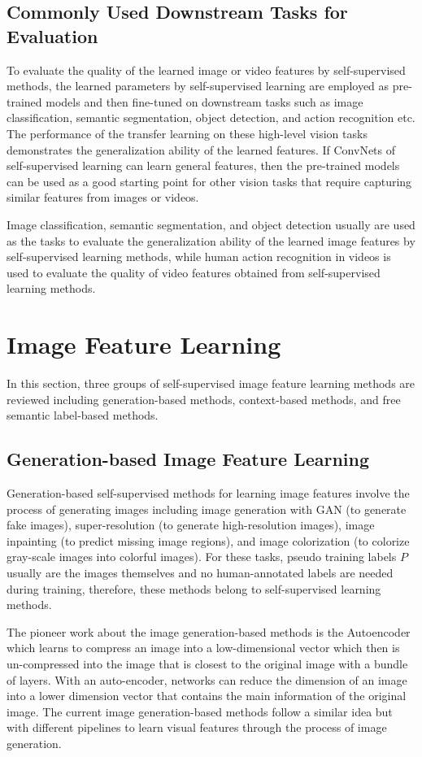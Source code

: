\documentclass[conference]{IEEEtran}
\begin{document}
\subsection{Commonly Used Downstream Tasks for Evaluation}
To evaluate the quality of the learned image or video features by self-supervised methods, the learned parameters by self-supervised learning are employed as pre-trained models and then fine-tuned on downstream tasks such as image classification, semantic segmentation, object detection, and action recognition etc.
The performance of the transfer learning on these high-level vision tasks demonstrates the generalization ability of the learned features.
If ConvNets of self-supervised learning can learn general features, then the pre-trained models can be used as a good starting point for other vision tasks that require capturing similar features from images or videos.

Image classification, semantic segmentation, and object detection usually are used as the tasks to evaluate the generalization ability of the learned image features by self-supervised learning methods, while human action recognition in videos is used to evaluate the quality of video features obtained from self-supervised learning methods.

\section{Image Feature Learning}
In this section, three groups of self-supervised image feature learning methods are reviewed including generation-based methods, context-based methods, and free semantic label-based methods.

\subsection{Generation-based Image Feature Learning}
Generation-based self-supervised methods for learning image features involve the process of generating images including image generation with GAN (to generate fake images), super-resolution (to generate high-resolution images), image inpainting (to predict missing image regions),
and image colorization (to colorize gray-scale images into colorful images).
For these tasks, pseudo training labels $P$ usually are the images themselves and no human-annotated labels are needed during training, therefore, these methods belong to self-supervised learning methods.

The pioneer work about the image generation-based methods is the Autoencoder which learns to compress an image into a low-dimensional vector which then is un-compressed into the image that is closest to the original image with a bundle of layers.
With an auto-encoder, networks can reduce the dimension of an image into a lower dimension vector that contains the main information of the original image.
The current image generation-based methods follow a similar idea but with different pipelines to learn visual features through the process of image generation.



\end{document}
